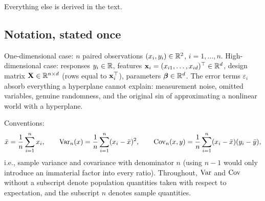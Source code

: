 Everything else is derived in the text.

\subsection{Notation, stated once}

One-dimensional case: $n$ paired observations $(x_i, y_i) \in \mathbb{R}^2$, $i = 1, \dots, n$. High-dimensional case: responses $y_i \in \mathbb{R}$, features $\mathbf{x}_i = (x_{i1}, \dots, x_{id})^\top \in \mathbb{R}^d$, design matrix $\mathbf{X} \in \mathbb{R}^{n \times d}$ (rows equal to $\mathbf{x}_i^\top$), parameters $\bm{\beta} \in \mathbb{R}^d$. The error terms $\varepsilon_i$ absorb everything a hyperplane cannot explain: measurement noise, omitted variables, genuine randomness, and the original sin of approximating a nonlinear world with a hyperplane.

Conventions:
\[
  \bar{x} = \frac{1}{n}\sum_{i=1}^n x_i, \qquad
  \mathrm{Var}_n(x) = \frac{1}{n}\sum_{i=1}^n (x_i - \bar{x})^2, \qquad
  \mathrm{Cov}_n(x, y) = \frac{1}{n}\sum_{i=1}^n (x_i - \bar{x})(y_i - \bar{y}),
\]
i.e., sample variance and covariance with denominator $n$ (using $n-1$ would only introduce an immaterial factor into every ratio). Throughout, $\mathrm{Var}$ and $\mathrm{Cov}$ without a subscript denote population quantities taken with respect to expectation, and the subscript $n$ denotes sample quantities.
